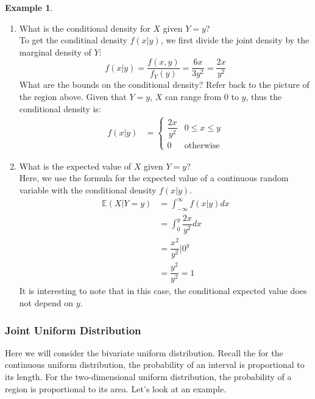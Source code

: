 \documentclass[12pt]{article}
\theoremstyle{definition}
\newtheorem*{example}{Example}
\theoremstyle{remark}
\def\E{{\mathbb E}}
\begin{document}
\begin{example}
\begin{enumerate}
\item What is the conditional density for $X$ given $Y = y$?\\

To get the conditinal density $f(x|y)$, we first divide the joint density by the marginal density of $Y$:
\[
f(x|y) = \frac{ f(x, y) }{f_Y(y)} = \frac{ 6 x }{ 3 y^2 } = \frac{ 2 x }{ y^2 }
\]
What are the bounds on the conditional density? Refer back to the picture of the region above. Given that $Y = y$, $X$ can range from 0 to $y$, thus the conditional density is:
\begin{align*}
f(x|y) &=  \begin{cases} 
      \dfrac{ 2 x }{ y^2 } & 0 \leq x \leq y \\
      0 & \textrm{otherwise}
   \end{cases}
\end{align*}

\item What is the expected value of $X$ given $Y = y$?\\

Here, we use the formula for the expected value of a continuous random variable with the conditional density $f(x|y)$.
\begin{align*}
\E(X|Y = y) &= \int_{-\infty}^\infty f(x|y) dx \\
&= \int_0^y \dfrac{ 2 x }{ y^2 } dx \\
&= \dfrac{x^2}{y^2}\Bigr|0^y \\
&= \dfrac{y^2}{y^2} = 1
\end{align*}
It is interesting to note that in this case, the conditional expected value does not depend on $y$.

\end{enumerate}
\end{example}

\subsubsection{Joint Uniform Distribution}
Here we will consider the bivariate uniform distribution. Recall the for the continuous uniform distribution, the probability of an interval is proportional to its length. For the two-dimensional uniform distribution, the probability of a region is proportional to its area. Let's look at an example.
\end{document}
